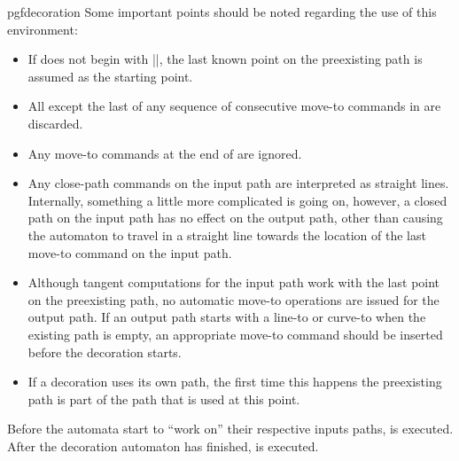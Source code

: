 \begin{environment}{{pgfdecoration}}
    Some important points should be noted regarding the use of this
    environment:
    \begin{itemize}
        \item If  does not begin with
            |\pgfpathmoveto|, the last known point on the preexisting path is
            assumed as the starting point.
        \item All except the last of any sequence of consecutive move-to
            commands in  are discarded.
        \item Any move-to commands at the end of 
            are ignored.
        \item Any close-path commands on the input path are interpreted as
            straight lines. Internally, something a little more complicated is
            going on, however, a closed path on the input path has no effect on
            the output path, other than causing the automaton to travel in a
            straight line towards the location of the last move-to command on
            the input path.
        \item Although tangent computations for the input path work with the
            last point on the preexisting path, no automatic move-to operations
            are issued for the output path. If an output path starts with a
            line-to or curve-to when the existing path is empty, an appropriate
            move-to command should be inserted before the decoration starts.
        \item If a decoration uses its own path, the first time this happens
            the preexisting path is part of the path that is used at this
            point.
    \end{itemize}

    Before the automata start to ``work on'' their respective inputs paths,
     is executed. After the decoration automaton has
    finished,  is executed.
\begin{codeexample}[preamble={\usetikzlibrary{decorations,decorations.pathmorphing}}]
\end{codeexample}


\end{environment}
